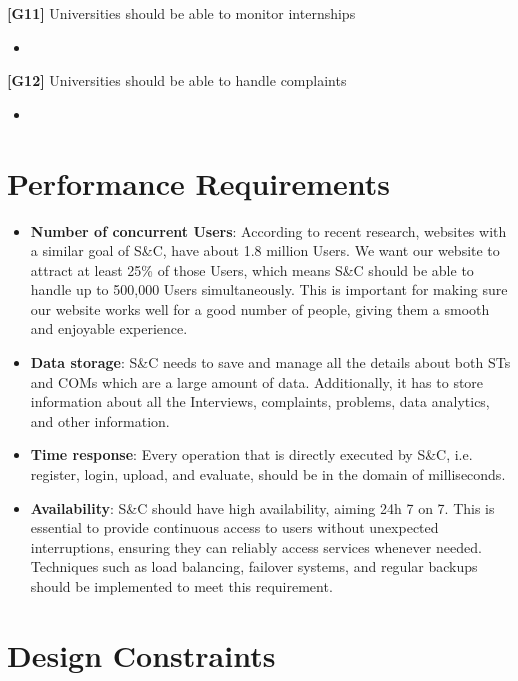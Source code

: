 \textbf{[G11]} Universities should be able to monitor internships
\begin{itemize}
    \item 
\end{itemize}

\textbf{[G12]} Universities should be able to handle complaints
\begin{itemize}
    \item 
\end{itemize}


\section{Performance Requirements}
\begin{itemize}
    \item \textbf{Number of concurrent Users}: According to recent research, websites with a similar goal of S\&C, have about 1.8 million Users. We want our website to attract at least 25\% of those Users, which means S\&C should be able to handle up to 500,000 Users simultaneously. This is important for making sure our website works well for a good number of people, giving them a smooth and enjoyable 
    experience.

    \item \textbf{Data storage}: S\&C needs to save and manage all the details about both STs and COMs which are a large amount of data. Additionally, it has to store information about all the Interviews, complaints, problems, data analytics, and other information.

    \item \textbf{Time response}: Every operation that is directly executed by S\&C, i.e. register, login, upload, and evaluate, should be in the domain of milliseconds. 

    \item \textbf{Availability}: S\&C should have high availability, aiming 24h 7 on 7. This is essential to provide continuous access to users without unexpected interruptions, ensuring they can reliably access services whenever needed. Techniques such as load balancing, failover systems, and regular backups should be implemented to meet this requirement.
    
\end{itemize}
 

\section{Design Constraints}
